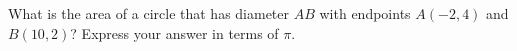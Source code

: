 What is the area of a circle that has diameter $AB$ with endpoints $A(-2,4)$ and $B(10,2)$? Express your answer in terms of $\pi$.
